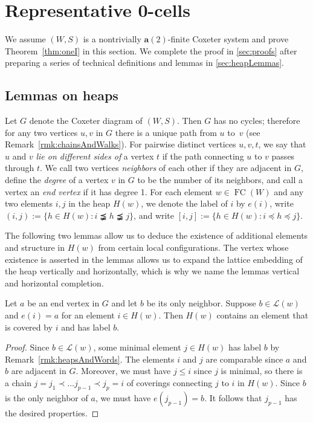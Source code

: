 \documentclass[ALCO,Unicode,published]{cedram}
\newcommand{\call}{\mathcal{L}}
\newcommand{\la}{\mathbf{a}}
\newcommand{\ntatf}{nontrivially $\la(2)$-finite }
\DeclareMathOperator{\fc}{\mathrm{FC}}
\begin{document}
\section{Representative 0-cells}
\label{sec:rep0cells}

We assume $(W,S)$ is a \ntatf Coxeter system and prove Theorem~\ref{thm:oneI} in this section. We complete
the proof in \autoref{sec:proofs} after preparing a series of technical definitions and lemmas in
\autoref{sec:heapLemmas}. 

\subsection{Lemmas on heaps}
\label{sec:heapLemmas}
Let $G$ denote the Coxeter diagram of $(W,S)$. Then $G$ has no cycles; therefore for any two
vertices $u,v$ in $G$ there is a unique path from $u$ to~$v$ (see Remark~\ref{rmk:chainsAndWalks}). For
pairwise distinct vertices $u,v,t$, we say that $u$ and $v$ \emph{lie on different sides of} a
vertex $t$ if the path connecting $u$ to $v$ passes through $t$. We call two vertices
\emph{neighbors} of each other if they are adjacent in $G$, define the \emph{degree} of a vertex $v$
in $G$ to be the number of its neighbors, and call a vertex an \emph{end vertex} if it has degree 1.
For each element $w\in \fc(W)$ and any two elements $i,j$ in the heap $H(w)$, we denote the label of
$i$ by $e(i)$, write $(i,j):=\{h\in H(w):i\precneqq h\precneqq j\}$, and write $[i,j]:=\{h\in
H(w):i\preceq h\preceq j\}$.

The following two lemmas allow us to deduce the existence of additional elements and structure in
$H(w)$ from certain local configurations.  The vertex whose existence is asserted in the lemmas
allows us to expand the lattice embedding of the heap vertically and horizontally, which is why we
name the lemmas vertical and horizontal completion.  

\begin{lemma} 
    \label{lemm:vertical}
    Let $a$ be an end vertex in $G$ and let $b$ be its only neighbor. Suppose $b\in \call(w)$ and
    $e(i)=a$ for an element $i\in H(w)$. Then $H(w)$ contains an element that is covered by $i$ and
    has label $b$.
\end{lemma}
\begin{proof} 
    Since $b\in \call(w)$, some minimal element $j\in H(w)$ has label $b$ by
    Remark~\ref{rmk:heapsAndWords}. The elements $i$ and $j$ are comparable since $a$ and $b$ are adjacent
    in $G$. Moreover, we must have $j\le i$ since $j$ is minimal, so there is a chain $j=j_1\prec
    \dots j_{p-1}\prec j_p=i$ of coverings connecting $j$ to $i$ in $H(w)$. Since $b$ is the only
    neighbor of $a$, we must have $e(j_{p-1})=b$. It follows that $j_{p-1}$ has the desired
    properties.
\end{proof}
\end{document}
